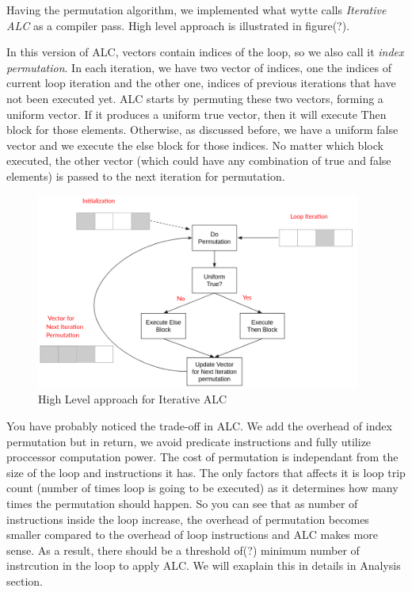 \documentclass[\main/thesis.tex]{subfiles}
\begin{document}
Having the permutation algorithm, we implemented what wytte calls \emph{Iterative ALC} as a compiler pass. High level approach is illustrated in figure(?).

In this version of ALC, vectors contain indices of the loop, so we also call it \emph{index permutation}. In each iteration, we have two vector of indices, one the indices of current loop iteration and the other one, indices of previous iterations that have not been executed yet. ALC starts by permuting these two vectors, forming a uniform vector. If it produces a uniform true vector, then it will execute 
Then block for those elements. Otherwise, as discussed before, we have a uniform false vector and we execute the else block for those indices. No matter which block executed, the other vector (which could have any combination of true and false elements) is passed to the next iteration for permutation.


\begin{figure}[t!]
    \centering
    \includegraphics[width=0.95\textwidth]{img/iterative_alc.png}
    \caption{High Level approach for Iterative ALC}
    \label{fig:iterative_alc}
\end{figure}

You have probably noticed the trade-off in ALC. We add the overhead of index permutation but in return, we avoid predicate instructions and fully utilize proccessor computation power. The cost of permutation is independant from the size of the loop and instructions it has. The only factors that affects it is loop trip count (number of times loop is going to be executed) as it determines how many times the permutation should happen.
So you can see that as number of instructions inside the loop increase, the overhead of permutation becomes smaller compared to the overhead of loop instructions and ALC makes more sense. As a result, there should be a threshold of(?) minimum number of instrcution in the loop to apply ALC. We will exaplain this in details in Analysis section.
\end{document}

